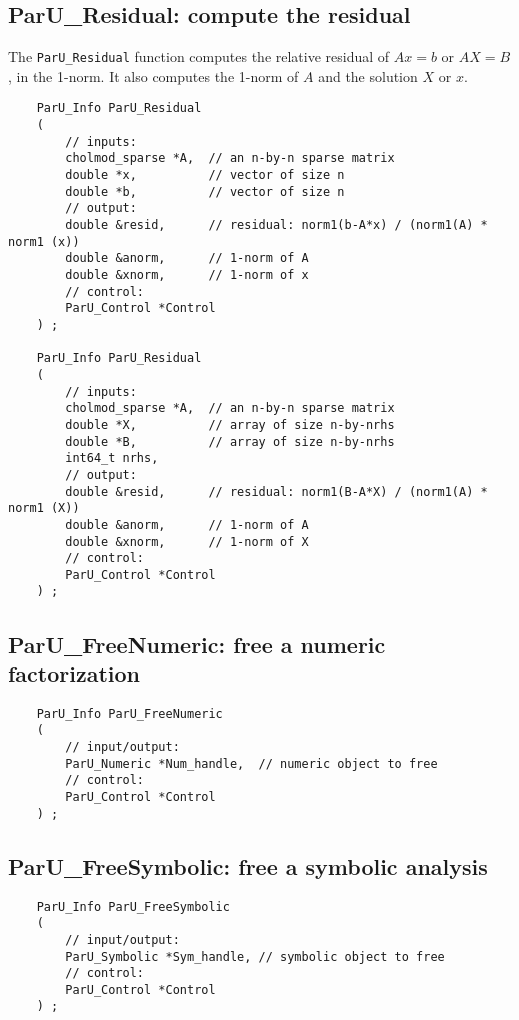 \documentclass[12pt]{article}
\begin{document}
\subsection{{\sf ParU\_Residual}: compute the residual}

    The \verb'ParU_Residual' function computes the relative residual of
    $Ax=b$ or $AX=B$, in the 1-norm.  It also computes the 1-norm of $A$
    and the solution $X$ or $x$.

    {\footnotesize
    \begin{verbatim}
    ParU_Info ParU_Residual
    (
        // inputs:
        cholmod_sparse *A,  // an n-by-n sparse matrix
        double *x,          // vector of size n
        double *b,          // vector of size n
        // output:
        double &resid,      // residual: norm1(b-A*x) / (norm1(A) * norm1 (x))
        double &anorm,      // 1-norm of A
        double &xnorm,      // 1-norm of x
        // control:
        ParU_Control *Control
    ) ;

    ParU_Info ParU_Residual
    (
        // inputs:
        cholmod_sparse *A,  // an n-by-n sparse matrix
        double *X,          // array of size n-by-nrhs
        double *B,          // array of size n-by-nrhs
        int64_t nrhs,
        // output:
        double &resid,      // residual: norm1(B-A*X) / (norm1(A) * norm1 (X))
        double &anorm,      // 1-norm of A
        double &xnorm,      // 1-norm of X
        // control:
        ParU_Control *Control
    ) ; \end{verbatim} }

\subsection{{\sf ParU\_FreeNumeric}: free a numeric factorization}

    {\footnotesize
    \begin{verbatim}
    ParU_Info ParU_FreeNumeric
    (
        // input/output:
        ParU_Numeric *Num_handle,  // numeric object to free
        // control:
        ParU_Control *Control
    ) ; \end{verbatim} }

\subsection{{\sf ParU\_FreeSymbolic}: free a symbolic analysis}

    {\footnotesize
    \begin{verbatim}
    ParU_Info ParU_FreeSymbolic
    (
        // input/output:
        ParU_Symbolic *Sym_handle, // symbolic object to free
        // control:
        ParU_Control *Control
    ) ; \end{verbatim} }
\end{document}
